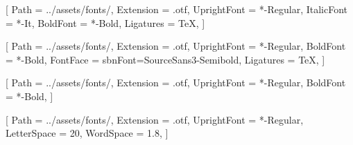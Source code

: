 %
%

\usepackage[paperwidth=100mm,paperheight=160mm,margin=0pt]{geometry}
\usepackage{fontspec}
\usepackage{tikz}
\usetikzlibrary{calc}
\usepackage{microtype}



\newcommand{\coverfontpath}{../assets/fonts/}

\newfontfamily{}[
  Path = \coverfontpath,
  Extension = .otf,
  UprightFont = *-Regular,
  ItalicFont = *-It,
  BoldFont = *-Bold,
  Ligatures = TeX,
]

\newfontfamily{}[
  Path = \coverfontpath,
  Extension = .otf,
  UprightFont = *-Regular,
  BoldFont = *-Bold,
  FontFace = {sb}{n}{Font=SourceSans3-Semibold},
  Ligatures = TeX,
]

\newfontfamily{}[
  Path = \coverfontpath,
  Extension = .otf,
  UprightFont = *-Regular,
  BoldFont = *-Bold,
]

\pagestyle{empty}
\setlength{\parindent}{0pt}

\newcommand{\covertitle}{The Senior Full Stack Handbook}
\newcommand{\coverauthor}{Salman Rahman}
\newcommand{\coverurl}{www.salmanrahman.com}

\newfontfamily{}[
  Path = \coverfontpath,
  Extension = .otf,
  UprightFont = *-Regular,
  LetterSpace = 20,
  WordSpace = 1.8,
]

\newcommand{\coverlabel}[1]{%
  {\coverlabelfont\fontsize{7pt}{9pt}\selectfont\color{inkmid}#1}%
}
